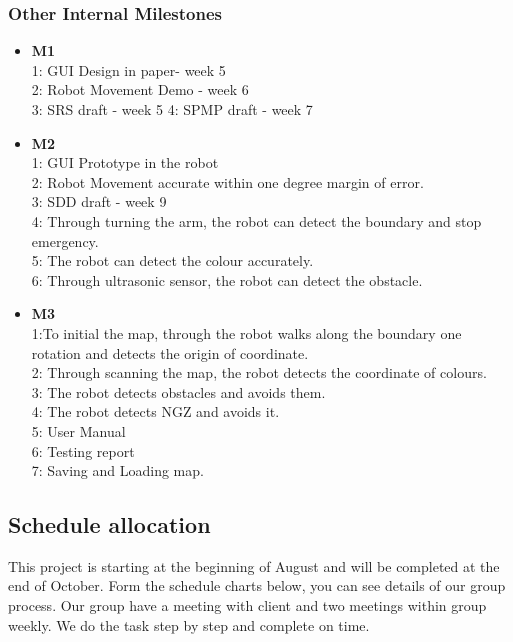 \documentclass[11pt, a4paper]{article}
\begin{document}
\subsubsection{Other Internal Milestones}
\begin{itemize}
\item {\bfseries M1} \\
1: GUI Design in paper- week 5\\
2: Robot Movement Demo - week 6\\
3: SRS draft - week 5
4: SPMP draft - week 7

\item {\bfseries M2}\\
1: GUI Prototype in the robot\\
2: Robot Movement accurate within one degree margin of error.\\
3: SDD draft - week 9\\
4: Through turning the arm, the robot can detect the boundary and stop emergency.\\
5: The robot can detect the colour accurately.\\
6: Through ultrasonic sensor, the robot can detect the obstacle.

\item {\bfseries M3}\\
1:To initial the map, through the robot walks along the boundary one rotation and detects the origin of coordinate.\\
2: Through scanning the map, the robot detects the coordinate of colours.\\
3: The robot detects obstacles and avoids them.\\
4: The robot detects NGZ and avoids it.\\
5: User Manual\\
6: Testing report\\
7: Saving and Loading map.\\

\end{itemize}
\newpage

\subsection{Schedule allocation}
This project is starting at the beginning of August and will be completed at the end of October. Form the schedule charts below, you can see details of our group process. Our group have a meeting with client and two meetings within group weekly. We do the task step by step and complete on time.
\end{document}

